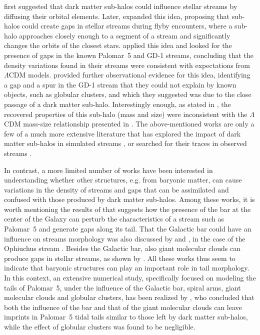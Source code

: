 \documentclass[draft]{aa}
\begin{document}
  \citet{2002MNRAS.332..915I} first suggested that dark matter sub-halos could influence stellar streams by diffusing their orbital elements. Later, \citet{2012ApJ...748...20C} expanded this idea, proposing that sub-halos could create gaps in stellar streams during flyby encounters, where a sub-halo approaches closely enough to a segment of a stream and significantly changes the orbits of the closest stars.  \citet{2012ApJ...760...75C, 2013ApJ...768..171C} applied this idea and looked for the presence of gaps in the known Palomar~5 and GD-1 streams, concluding that the density variations found in their streams were consistent with expectations from $\Lambda$CDM models.  \citet{2019ApJ...880...38B} provided further observational evidence for this idea, identifying a gap and a spur in the GD-1 stream that they could not explain by known objects, such as globular clusters, and which they suggested was due to the close passage of a dark matter sub-halo. Interestingly enough, as stated in \citet{2019ApJ...880...38B}, the recovered properties of this sub-halo (mass and size) were inconsistent with the $\Lambda$CDM mass-size relationship presented in \cite{2017MNRAS.466.4974M}. The above-mentioned works are only a few of a much more extensive literature that has explored the impact of dark matter sub-halos in simulated streams \citep{2016ApJ...828L..10H, 2021MNRAS.507.1999H, 2021JCAP...10..043B, 2024arXiv240402953H, 2024arXiv241021174N}, or searched for their traces in observed streams \citep{2016MNRAS.460.2711T, 2017MNRAS.470...60E, 2020ApJ...889...70B, 2020ApJ...892L..37B}.

  In contrast, a more limited number of works have been interested in understanding whether other structures, e.g. from baryonic matter, can cause variations in the density of streams and gaps that can be assimilated and confused with those produced by dark matter sub-halos.  Among these works, it is worth mentioning the results of \citet{2017NatAs...1..633P} that suggests how the presence of the bar at the center of the Galaxy can perturb the characteristics of a stream such as Palomar~5 and generate gaps along its tail. That the Galactic bar could have an influence on streams morphology was also discussed by \citet{2016MNRAS.460..497H} and \citet{2016ApJ...824..104P}, in the case of the Ophiuchus stream \citep{2014MNRAS.443L..84B}. Besides the Galactic bar, also giant molecular clouds can produce gaps in stellar streams, as shown by \citet{2016MNRAS.463L..17A}. All these works thus seem to indicate that baryonic structures can play an important role in tail morphology. In this context,  an extensive numerical study, specifically focused on modeling the tails of Palomar~5, under the influence of the Galactic bar, spiral arms, giant molecular clouds and globular clusters, has been realized by \citet{2019MNRAS.484.2009B}, who concluded that both the influence of the bar and that of the giant molecular clouds can leave imprints in Palomar~5 tidal tails similar to those left by dark matter sub-halos, while the effect of globular clusters was found to be negligible. 
  
\end{document}
